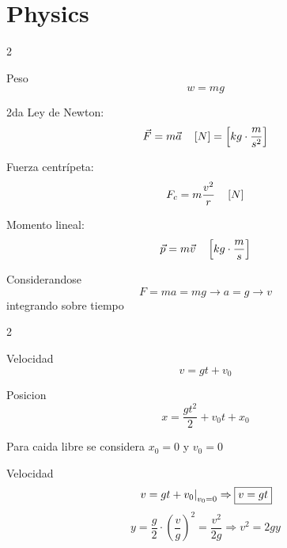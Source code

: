 \documentclass{article}
\begin{document}
    
\section{Physics}
                          \begin{multicols}{2}

                            \begin{itemform}
                            \item Peso
                              $$w=mg$$
                            \item 2da Ley de Newton:
                              $$\vec{F} = m\vec{a} \quad \left[N \right] = \left[kg\cdot \dfrac{m}{s^2} \right]$$
                            \item Fuerza centrípeta:
                              $$F_c = m\frac{v^2}{r} \quad \left[N \right]$$
                            \item Momento lineal:
                              $$\vec{p} = m\vec{v} \quad \left[kg\cdot \dfrac{m}{s} \right]$$
                            \end{itemform}
                            Considerandose
                            $$F=ma=mg \rightarrow a=g\rightarrow v$$
                            integrando sobre tiempo
                            \begin{multicols}{2}                                
                            \begin{itemform}
                            \item Velocidad
                              $$v=gt+v_0$$
                            
                            \columnbreak
                            \item Posicion
                              $$x=\dfrac{gt^2}{2}+v_0t+x_0$$
                            \end{itemform}
                            \end{multicols}

                            Para caida libre se considera $x_0=0$ y $v_0=0$

                            \begin{itemform}
                            \item Velocidad
                              $$\left. v=gt+v_0 \right|_{{v_0=0}}\Rightarrow\boxed{v = gt}$$
                              $$
                              y = \frac{g}{2} \cdot \left(\frac{v}{g}\right)^2 = \frac{v^2}{2g} \Rightarrow \boxed{v^2 = 2gy}
                              $$


\end{itemform}
\end{multicols}
\end{document}
